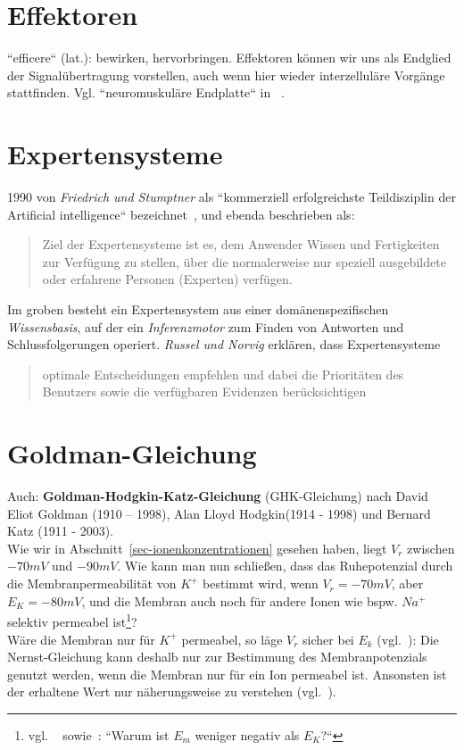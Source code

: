 \section{Effektoren}
``efficere`` (lat.): bewirken, hervorbringen.
Effektoren können wir uns als Endglied der Signalübertragung vorstellen, auch wenn hier wieder interzelluläre Vorgänge stattfinden. Vgl. ``neuromuskuläre Endplatte`` in ~\cite[127, Abs. 3]{BCP18}.

\section{Expertensysteme}\label{appendix:expertensystem}

1990 von \textit{Friedrich und Stumptner} als ``kommerziell erfolgreichste Teildisziplin der Artificial intelligence`` bezeichnet~\cite[14]{FS90}, und ebenda beschrieben als:

\blockquote[{\cite[14]{FS90}}]{
    Ziel der Expertensysteme ist es, dem Anwender Wissen und Fertigkeiten zur Verfügung zu stellen, über die normalerweise nur speziell ausgebildete oder erfahrene Personen (Experten) verfügen.
}

\noindent
Im groben besteht ein Expertensystem aus einer domänenspezifischen \textit{Wissensbasis}, auf der ein \textit{Inferenzmotor} zum Finden von Antworten und Schlussfolgerungen operiert. \textit{Russel und Norvig} erklären, dass Expertensysteme

\blockquote[{\cite[737]{RN09}}]{
    optimale Entscheidungen empfehlen und dabei die Prioritäten des Benutzers sowie die verfügbaren Evidenzen berücksichtigen
}


\section{Goldman-Gleichung}\label{appendix:goldman}

Auch: \textbf{Goldman-Hodgkin-Katz-Gleichung} (GHK-Gleichung) nach David Eliot Goldman (1910 – 1998), Alan Lloyd Hodgkin(1914 - 1998) und Bernard Katz (1911 - 2003).\\

Wie wir in Abschnitt~\ref{sec-ionenkonzentrationen} gesehen haben, liegt $V_r$ zwischen $-70 mV$ und $- 90mV$. Wie kann man nun schließen, dass das Ruhepotenzial durch die Membranpermeabilität von $K^+$ bestimmt wird, wenn $V_r = -70 mV$, aber $E_K = -80 mV$, und die Membran auch noch für andere Ionen wie bspw. $Na^+$ selektiv permeabel ist\footnote{
    vgl. ~\cite[77]{BCP18} sowie~\cite[44]{SD07}: ``Warum ist $E_m$ weniger negativ als $E_K${?}``
}? \\
Wäre die Membran nur für $K^+$ permeabel, so läge $V_r$ sicher bei $E_k$ (vgl.~\cite[32]{SD07}): Die Nernst-Gleichung kann deshalb nur zur Bestimmung des Membranpotenzials genutzt werden, wenn die Membran nur für ein Ion permeabel ist.
Ansonsten ist der erhaltene Wert nur näherungsweise zu verstehen (vgl.~\cite[67]{FE19}).\\

